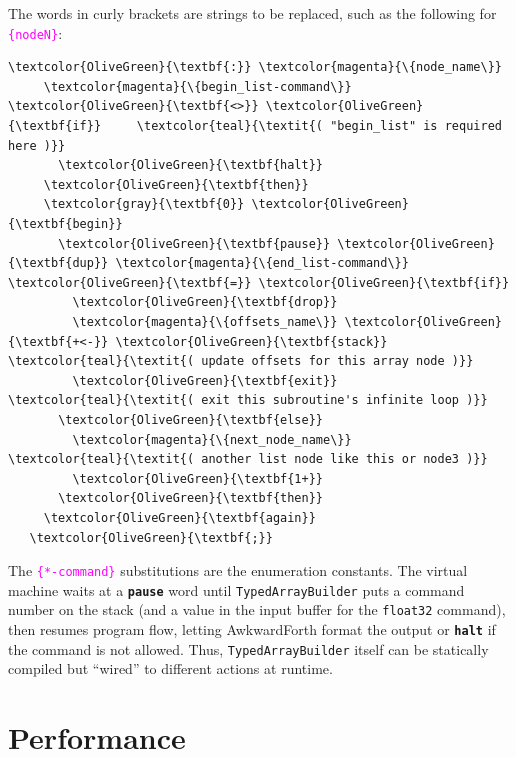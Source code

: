 \documentclass{webofc}
\begin{document}
\noindent The words in curly brackets are strings to be replaced, such as the following for \textcolor{magenta}{\tt \{nodeN\}}:

\small
\begin{Verbatim}[commandchars=\\\{\}]
   \textcolor{OliveGreen}{\textbf{:}} \textcolor{magenta}{\{node_name\}}
     \textcolor{magenta}{\{begin_list-command\}} \textcolor{OliveGreen}{\textbf{<>}} \textcolor{OliveGreen}{\textbf{if}}     \textcolor{teal}{\textit{( "begin_list" is required here )}}
       \textcolor{OliveGreen}{\textbf{halt}}
     \textcolor{OliveGreen}{\textbf{then}}
     \textcolor{gray}{\textbf{0}} \textcolor{OliveGreen}{\textbf{begin}}
       \textcolor{OliveGreen}{\textbf{pause}} \textcolor{OliveGreen}{\textbf{dup}} \textcolor{magenta}{\{end_list-command\}} \textcolor{OliveGreen}{\textbf{=}} \textcolor{OliveGreen}{\textbf{if}}
         \textcolor{OliveGreen}{\textbf{drop}}
         \textcolor{magenta}{\{offsets_name\}} \textcolor{OliveGreen}{\textbf{+<-}} \textcolor{OliveGreen}{\textbf{stack}}   \textcolor{teal}{\textit{( update offsets for this array node )}}
         \textcolor{OliveGreen}{\textbf{exit}}                       \textcolor{teal}{\textit{( exit this subroutine's infinite loop )}}
       \textcolor{OliveGreen}{\textbf{else}}
         \textcolor{magenta}{\{next_node_name\}}           \textcolor{teal}{\textit{( another list node like this or node3 )}}
         \textcolor{OliveGreen}{\textbf{1+}}
       \textcolor{OliveGreen}{\textbf{then}}
     \textcolor{OliveGreen}{\textbf{again}}
   \textcolor{OliveGreen}{\textbf{;}}
\end{Verbatim}
\normalsize

\noindent The \textcolor{magenta}{\tt \{*-command\}} substitutions are the enumeration constants. The virtual machine waits at a \textcolor{OliveGreen}{\tt\textbf{pause}} word until {\tt TypedArrayBuilder} puts a command number on the stack (and a value in the input buffer for the {\tt float32} command), then resumes program flow, letting AwkwardForth format the output or \textcolor{OliveGreen}{\tt\textbf{halt}} if the command is not allowed. Thus, {\tt TypedArrayBuilder} itself can be statically compiled but ``wired'' to different actions at runtime.

\section{Performance}
\label{sec:performance}
\end{document}
